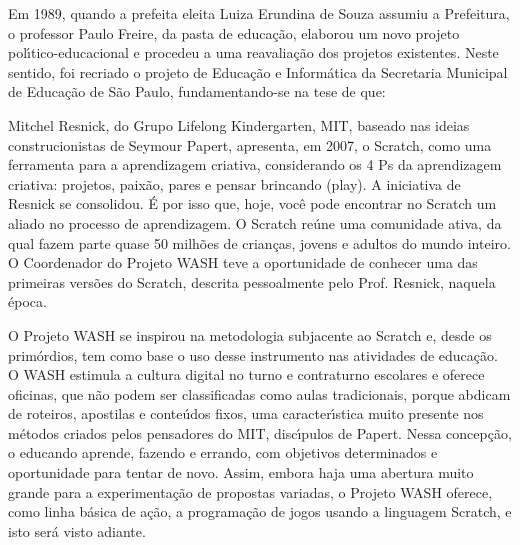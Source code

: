 \documentclass[
12pt,		%
openright,	%
twoside,  %
a4paper,			%
chapter=TITLE,		%
english,			%
french,				%
spanish,			%
brazil				%
]{USPSC-classe/USPSC}
\begin{document}
Em 1989, quando a prefeita eleita Luiza Erundina de Souza assumiu a Prefeitura, o professor Paulo Freire, da pasta de educa\c{c}\~ao, elaborou um novo projeto pol\'{\i}tico-educacional e procedeu a uma reavalia\c{c}\~ao dos projetos existentes. Neste sentido, foi recriado o projeto de Educa\c{c}\~ao e Inform\'atica da Secretaria Municipal de Educa\c{c}\~ao de S\~ao Paulo, fundamentando-se na tese de que:



\noindent\begin{center}\mbox{\centering{}}\end{center}


Mitchel Resnick, do Grupo Lifelong Kindergarten, MIT, baseado nas ideias construcionistas de Seymour Papert, apresenta, em 2007, o Scratch, como uma ferramenta para a aprendizagem criativa, considerando  os 4 Ps da aprendizagem criativa: projetos, paix\~ao, pares e pensar brincando (play). A  iniciativa de Resnick se consolidou. \'E por isso que, hoje, voc\^e pode encontrar no Scratch um aliado no processo de aprendizagem. O Scratch re\'une uma comunidade ativa, da qual fazem parte quase 50 milh\~oes de crian\c{c}as, jovens e adultos do mundo inteiro. O Coordenador do Projeto WASH teve a oportunidade de conhecer uma das primeiras vers\~oes do Scratch, descrita pessoalmente pelo Prof. Resnick, naquela \'epoca.


O Projeto WASH se inspirou na metodologia subjacente ao Scratch e, desde os prim\'ordios, tem como base o uso desse instrumento nas atividades de educa\c{c}\~ao. O WASH estimula a cultura digital no turno e contraturno escolares e oferece oficinas, que n\~ao podem ser classificadas como aulas tradicionais, porque abdicam de roteiros, apostilas e conte\'udos fixos, uma caracter\'{\i}stica muito presente nos m\'etodos criados pelos pensadores do MIT, disc\'{\i}pulos de Papert. Nessa concep\c{c}\~ao, o educando aprende, fazendo e errando, com objetivos determinados e oportunidade para tentar de novo. Assim, embora haja uma abertura muito grande para a experimenta\c{c}\~ao de propostas variadas, o Projeto WASH oferece, como linha b\'asica de a\c{c}\~ao, a programa\c{c}\~ao de jogos usando a linguagem Scratch, e isto ser\'a visto adiante.
\end{document}
